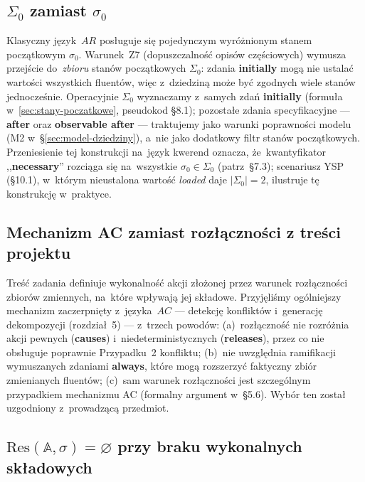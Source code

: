 \documentclass[11pt,a4paper]{article}
\newif\ifshowbib
\newcommand{\bibonly}[1]{\ifshowbib#1\fi}
\renewcommand{\cite}[2][]{\unskip}%
\newcommand{\causes}{\textbf{causes}}
\newcommand{\initially}{\textbf{initially}}
\newcommand{\always}{\textbf{always}}
\newcommand{\releases}{\textbf{releases}}
\newcommand{\necessary}{\textbf{necessary}}
\theoremstyle{definition}
\begin{document}
\subsection{\texorpdfstring{$\Sigma_0$}{Sigma0} zamiast \texorpdfstring{$\sigma_0$}{sigma0}}

Klasyczny język~$AR$ posługuje się pojedynczym wyróżnionym stanem początkowym $\sigma_0$. Warunek~Z7 (dopuszczalność opisów częściowych) wymusza przejście do~\emph{zbioru} stanów początkowych $\Sigma_0$: zdania \initially{} mogą nie ustalać wartości wszystkich fluentów, więc z~dziedziną może być zgodnych wiele stanów jednocześnie. Operacyjnie $\Sigma_0$ wyznaczamy z~samych zdań \initially{} (formuła w~\ref{sec:stany-poczatkowe}, pseudokod \S8.1); pozostałe zdania specyfikacyjne --- \textbf{after} oraz \textbf{observable after} --- traktujemy jako warunki poprawności modelu (M2 w~\S\ref{sec:model-dziedziny}), a~nie jako dodatkowy filtr stanów początkowych. Przeniesienie tej konstrukcji na~język kwerend oznacza, że~kwantyfikator ,,\necessary{}'' rozciąga się na~wszystkie $\sigma_0 \in \Sigma_0$ (patrz~\S7.3); scenariusz YSP (\S10.1), w~którym nieustalona wartość \textit{loaded} daje $|\Sigma_0|=2$, ilustruje tę konstrukcję w~praktyce.

\subsection{Mechanizm AC zamiast rozłączności z treści projektu}

Treść zadania\bibonly{~\cite{projekt4}} definiuje wykonalność akcji złożonej przez warunek rozłączności zbiorów zmiennych, na~które wpływają jej składowe. Przyjęliśmy ogólniejszy mechanizm zaczerpnięty z~języka~$AC$ --- detekcję konfliktów i~generację dekompozycji (rozdział~5) --- z~trzech powodów: (a)~rozłączność nie rozróżnia akcji pewnych (\causes{}) i~niedeterministycznych (\releases{}), przez co nie obsługuje poprawnie Przypadku~2 konfliktu; (b)~nie uwzględnia ramifikacji wymuszanych zdaniami \always{}, które mogą rozszerzyć faktyczny zbiór zmienianych fluentów; (c)~sam warunek rozłączności jest szczególnym przypadkiem mechanizmu AC (formalny argument w~\S5.6). Wybór ten został uzgodniony z~prowadzącą przedmiot.

\subsection{\texorpdfstring{$\mathrm{Res}(\mathbb{A},\sigma)=\varnothing$}{Res(A,sigma)=empty} przy braku wykonalnych składowych}
\end{document}
